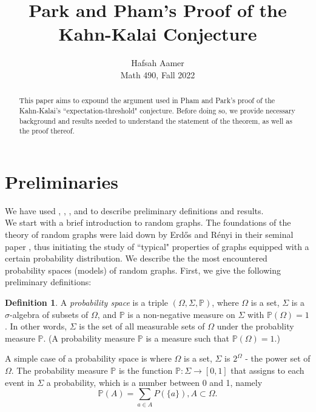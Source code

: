 \documentclass[12pt,oneside,reqno]{amsart}
\theoremstyle{definition}
\newtheorem{definition}[theorem]{Definition}
\numberwithin{equation}{theorem}
\newcommand{\PP}{{\mathbb P}}%
\begin{document}
\title[]{Park and Pham's Proof of the Kahn-Kalai Conjecture} 

\author{Hafsah Aamer \\
Math 490, Fall 2022}





\begin{abstract} This paper aims to expound the argument used in Pham and Park's proof of the Kahn-Kalai's ``expectation-threshold" conjecture. Before doing so, we provide necessary background and results needed to understand the statement of the theorem, as well as the proof thereof.
\end{abstract}
\maketitle




\section{Preliminaries}

 We have used \cite{mbk}, \cite{sbk}, \cite{tf}, and \cite{okkc} to describe preliminary definitions and results.
\newline 
\\
We start with a brief introduction to random graphs. The foundations of the theory of random graphs were laid down by Erd\H{o}s and R\'{e}nyi in their seminal paper \cite{er}, thus initiating the study of ``typical" properties of graphs equipped with a certain probability distribution. We describe the the most encountered probability spaces (models) of random graphs. First, we give the following preliminary definitions: 

\begin{definition}
A \emph{probability space} is a triple $(\Omega, \Sigma, \PP)$, where $\Omega$ is a set, $\Sigma$ is a $\sigma$-algebra of subsets of $\Omega$, and $\PP$ is a non-negative measure on $\Sigma$ with 
$\PP(\Omega)=1$. In other words, $\Sigma$ is the set of all measurable sets of $\Omega$ under the probablity measure $\PP$. (A probability measure $\PP$ is a measure such that $\PP(\Omega)=1$.)
\end{definition}

A simple case of a probability space is where $\Omega$ is a set, $\Sigma$ is $2^{\Omega}$ - the power set of $\Omega$. The probability measure $\PP$ is the function $\PP: \Sigma \rightarrow[0,1]$ that assigns to each event in $\Sigma$ a probability, which is a number between 0 and 1, namely
$$
\PP(A)=\sum_{a \in A} P(\{a\}), A \subset \Omega .
$$
\end{document}
